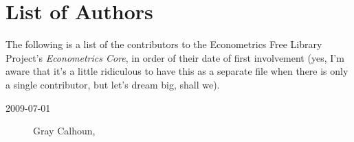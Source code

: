 

\part*{List of Authors}%

\noindent%
The following is a list of the contributors to the Econometrics Free
Library Project's \textit{Econometrics Core}, in order of their date
of first involvement (yes, I'm aware that it's a little ridiculous to
have this as a separate file when there is only a single contributor,
but let's dream big, shall we).

\begin{description}
\item[2009-07-01] Gray Calhoun, 
\end{description}
